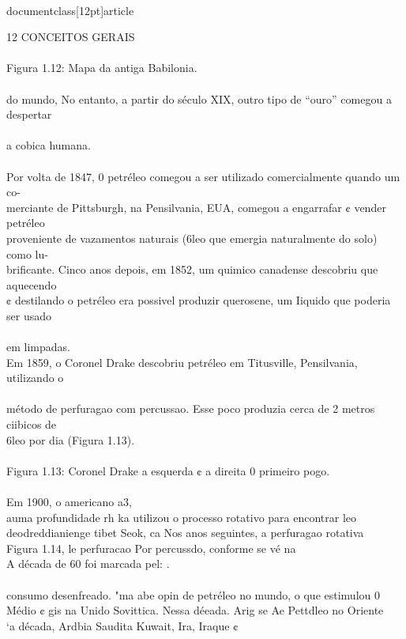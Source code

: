 \\documentclass[12pt]{article}
\begin{document}
{12 CONCEITOS GERAIS\\
\\
Figura 1.12: Mapa da antiga Babilonia.\\
\\
do mundo, No entanto, a partir do século XIX, outro tipo de “ouro” comegou a despertar\\
\\
a cobica humana.\\
\\
Por volta de 1847, 0 petréleo comegou a ser utilizado comercialmente quando um co-\\
merciante de Pittsburgh, na Pensilvania, EUA, comegou a engarrafar ¢ vender petréleo\\
proveniente de vazamentos naturais (6leo que emergia naturalmente do solo) como lu-\\
brificante. Cinco anos depois, em 1852, um quimico canadense descobriu que aquecendo\\
¢ destilando o petréleo era possivel produzir querosene, um Iiquido que poderia ser usado\\
\\
em limpadas.\\
Em 1859, o Coronel Drake descobriu petréleo em Titusville, Pensilvania, utilizando o\\
\\
método de perfuragao com percussao. Esse poco produzia cerca de 2 metros ciibicos de\\
6leo por dia (Figura 1.13).\\
\\
Figura 1.13: Coronel Drake a esquerda ¢ a direita 0 primeiro pogo.\\
\\
Em 1900, o americano a3,\\
auma profundidade rh ka utilizou o processo rotativo para encontrar leo\\
deodreddianienge tibet Seok, ca Nos anos seguintes, a perfuragao rotativa\\
Figura 1.14, le perfuracao Por percussdo, conforme se vé na\\
A década de 60 foi marcada pel: .\\
\\
consumo desenfreado. "ma abe opin de petréleo no mundo, o que estimulou 0\\
Médio ¢ gis na Unido Sovittica. Nessa déeada. Arig se Ae Pettdleo no Oriente\\
‘a década, Ardbia Saudita Kuwait, Ira, Iraque ¢\\
}
\end{document}
